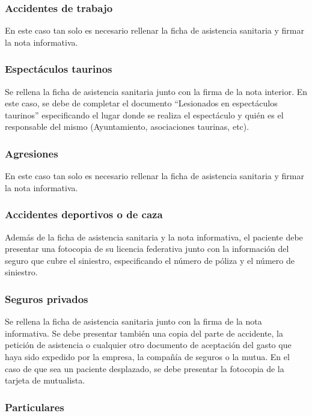 \subsubsection{Accidentes de trabajo}

En este caso tan solo es necesario rellenar la ficha de asistencia sanitaria y firmar la nota informativa.

\subsubsection{Espectáculos taurinos}

Se rellena la ficha de asistencia sanitaria junto con la firma de la nota interior.
En este caso, se debe de completar el documento ``Lesionados en espectáculos taurinos'' especificando el lugar donde se realiza el espectáculo y quién es el responsable del mismo (Ayuntamiento, asociaciones taurinas, etc).

\subsubsection{Agresiones}

En este caso tan solo es necesario rellenar la ficha de asistencia sanitaria y firmar la nota informativa.

\subsubsection{Accidentes deportivos o de caza}

Además de la ficha de asistencia sanitaria y la nota informativa, el paciente debe presentar una fotocopia de su licencia federativa junto con la información del seguro que cubre el siniestro, especificando el número de póliza y el número de siniestro.

\subsubsection{Seguros privados}

Se rellena la ficha de asistencia sanitaria junto con la firma de la nota informativa.
Se debe presentar también una copia del parte de accidente, la petición de asistencia o cualquier otro documento de aceptación del gasto que haya sido expedido por la empresa, la compañía de seguros o la mutua.
En el caso de que sea un paciente desplazado, se debe presentar la fotocopia de la tarjeta de mutualista.

\subsubsection{Particulares}

